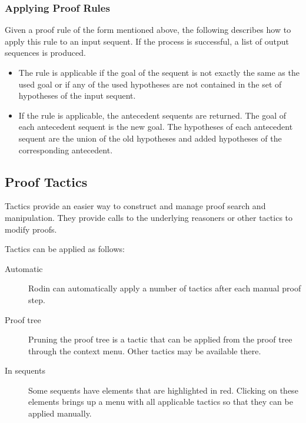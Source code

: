 \subsubsection{Applying Proof Rules}

Given a proof rule of the form mentioned above, the following describes how to apply this rule to an input sequent. If the process is successful, a list of output sequences is produced. 

\begin{itemize}
	\item The rule is applicable if the goal of the sequent is not exactly the same as the used goal or if any of the used hypotheses are not contained in the set of hypotheses of the input sequent. 
	\item If the rule is applicable, the antecedent sequents are returned. The goal of each antecedent sequent is the new goal. The hypotheses of each antecedent sequent are the union of the old hypotheses and added hypotheses of the corresponding antecedent. 
\end{itemize}


\subsection{Proof Tactics}
\label{proof_tactics}

Tactics provide an easier way to construct and manage proof search and manipulation. They provide calls to the underlying reasoners or other tactics to modify proofs.


Tactics can be applied as follows:

\begin{description}
	\item[Automatic] Rodin can automatically apply a number of tactics after each manual proof step.
	\item[Proof tree] Pruning the proof tree is a tactic that can be applied from the proof tree through the context menu.  Other tactics may be available there.
	\item[In sequents] Some sequents have elements that are highlighted in red.  Clicking on these elements brings up a menu with all applicable tactics so that they can be applied manually.
\end{description}

